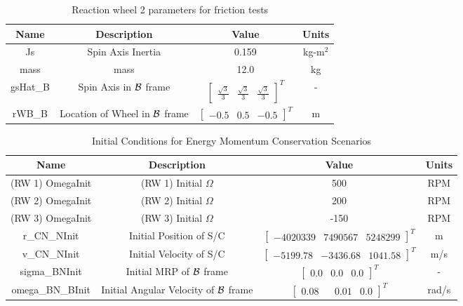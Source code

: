 \begin{table}[htbp]
	\caption{Reaction wheel 2 parameters for friction tests}
	\label{tab:rwFriction2}
	\centering \fontsize{10}{10}\selectfont
	\begin{tabular}{ c | c | c | c } %
		\hline
		\textbf{Name}  & \textbf{Description}  & \textbf{Value} & \textbf{Units} \\
		\hline
		Js  & Spin Axis Inertia & 0.159 & kg-m$^2$ \\
		mass & mass & 12.0 & kg \\
		gsHat\_B & Spin Axis in $\cal{B}$ frame & $\begin{bmatrix}
		\frac{\sqrt{3}}{3} & \frac{\sqrt{3}}{3} & \frac{\sqrt{3}}{3} \end{bmatrix}^T$ & - \\
		rWB\_B & Location of Wheel in $\cal{B}$ frame & $\begin{bmatrix}
		-0.5 & 0.5 & -0.5 \end{bmatrix}^T$ & m \\
		\hline
	\end{tabular}
\end{table}

\begin{table}[htbp]
	\caption{Initial Conditions for Energy Momentum Conservation Scenarios}
	\label{tab:initial}
	\centering \fontsize{10}{10}\selectfont
	\begin{tabular}{ c | c | c | c } %
		\hline
		\textbf{Name}  & \textbf{Description}  & \textbf{Value} & \textbf{Units} \\
		\hline
		(RW 1) OmegaInit  & (RW 1) Initial $\Omega$ & 500 & RPM \\
		(RW 2) OmegaInit  & (RW 2) Initial $\Omega$ & 200 & RPM \\
		(RW 3) OmegaInit  & (RW 3) Initial $\Omega$ & -150 & RPM \\
		r\_CN\_NInit & Initial Position of S/C & $\begin{bmatrix}
		-4020339 &	7490567 & 5248299 
		\end{bmatrix}^T$ & m \\
		v\_CN\_NInit & Initial Velocity of S/C & $\begin{bmatrix}
		-5199.78 & -3436.68 & 1041.58
		\end{bmatrix}^T$ & m/s \\
		sigma\_BNInit & Initial MRP of $\cal{B}$ frame & $\begin{bmatrix}
		0.0 & 0.0 & 0.0
		\end{bmatrix}^T$ & - \\
		omega\_BN\_BInit & Initial Angular Velocity of $\cal{B}$ frame & $\begin{bmatrix}
		0.08 & & 0.01 & 0.0
		\end{bmatrix}^T$ & rad/s \\
		\hline
	\end{tabular}
\end{table}

